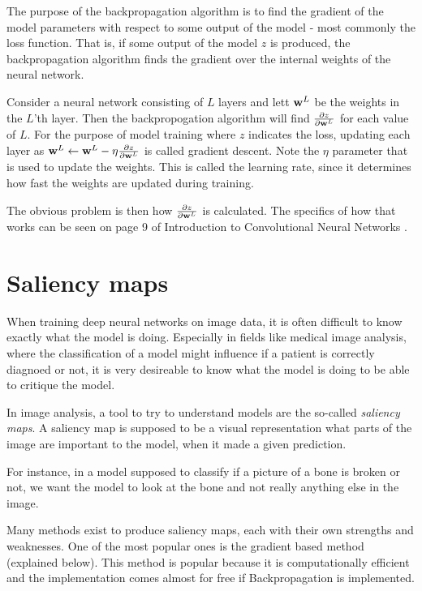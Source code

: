 The purpose of the backpropagation algorithm is to find the gradient of the model parameters with respect
to some output of the model - most commonly the loss function.
That is, if some output of the model $z$ is produced, the backpropagation algorithm finds the gradient over
the internal weights of the neural network.

Consider a neural network consisting of $L$ layers and lett $\textbf{w}^L$ be the weights in the $L$'th layer.
Then the backpropogation algorithm will find 
$\frac{\partial z}{\partial \textbf{w}^L}$ for each value of $L$.
For the purpose of model training where $z$ indicates the loss, updating each layer as 
$\textbf{w}^L \leftarrow \textbf{w}^L - \eta \frac{\partial z}{\partial \textbf{w}^L}$
is called gradient descent.
Note the $\eta$ parameter that is used to update the weights.
This is called the learning rate, since it determines how fast the weights are updated during training.

The obvious problem is then how $\frac{\partial z}{\partial \textbf{w}^L}$ is calculated.
The specifics of how that works can be seen on page 9 of Introduction to Convolutional Neural Networks \cite{tensorIntroduction}.



\section{Saliency maps}\label{sec:saliency_maps}
When training deep neural networks on image data,
it is often difficult to know exactly what the model is doing.
Especially in fields like medical image analysis, 
where the classification of a model might influence if a patient is correctly diagnoed or not,
it is very desireable to know what the model is doing to be able to critique the model.

In image analysis, a tool to try to understand models are the so-called \textit{saliency maps}.
A saliency map is supposed to be a visual representation what parts of the image are important to the model,
when it made a given prediction.

For instance, in a model supposed to classify if a picture of a bone is broken or not,
we want the model to look at the bone and not really anything else in the image.

Many methods exist to produce saliency maps, each with their own strengths and weaknesses.
One of the most popular ones is the gradient based method (explained below).
This method is popular because it is computationally efficient and the implementation comes almost for free if Backpropagation is implemented.


